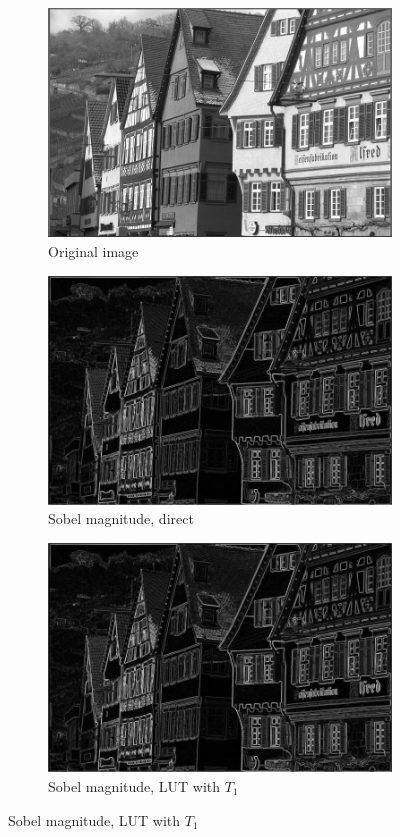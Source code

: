\documentclass[12pt]{amsart}
\theoremstyle{definition}
\theoremstyle{remark}
\numberwithin{thm}{section}
\begin{document}
\begin{figure}[h] \centering 
\begin{subfigure}[b]{0.4\textwidth} \includegraphics[width=\textwidth]{german.jpg} \caption{Original image} %
\end{subfigure}
\begin{subfigure}[b]{0.4\textwidth} \includegraphics[width=\textwidth]{german0.jpg} \caption{Sobel magnitude, direct}\end{subfigure}
\begin{subfigure}[b]{0.4\textwidth} \includegraphics[width=\textwidth]{german1.jpg} \caption{Sobel magnitude, LUT with $T_1$} %

\end{subfigure}
\end{figure}
\end{document}
